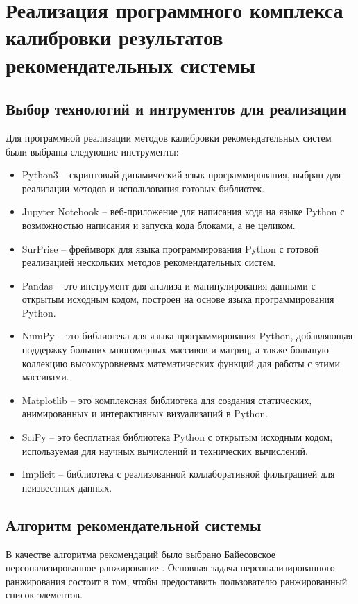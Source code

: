 \section{Реализация программного комплекса калибровки результатов рекомендательных системы}
\subsection{Выбор технологий и интрументов для реализации}
Для программной реализации методов калибровки рекомендательных систем были выбраны следующие инструменты:
\begin{itemize} 
    \item Python3 -- скриптовый динамический язык программирования, 
    выбран для реализации методов и использования готовых библиотек.
    \item Jupyter Notebook -- веб-приложение для написания кода на языке Python 
    с возможностью написания и запуска кода блоками, а не целиком.
    \item SurPrise \cite{sur} -- фреймворк для языка программирования Python
    с готовой реализацией нескольких методов рекомендательных систем.
    \item Pandas \cite{pandas} -- это инструмент для анализа и манипулирования данными с открытым исходным кодом,
    построен на основе языка программирования Python.
    \item NumPy \cite{numpy} -- это библиотека для языка программирования Python, добавляющая поддержку больших многомерных массивов и матриц, а также большую коллекцию высокоуровневых математических функций для работы с этими массивами.
    \item Matplotlib \cite{plot} -- это комплексная библиотека для создания статических, анимированных и интерактивных визуализаций в Python.
    \item SciPy \cite{Scipy} -- это бесплатная библиотека Python с открытым исходным кодом, используемая для научных вычислений и технических вычислений.
    \item Implicit \cite{imp} -- библиотека с реализованной коллаборативной фильтрацией для неизвестных данных.
  \end{itemize}

\pagebreak

\subsection{Алгоритм рекомендательной системы}

В качестве алгоритма рекомендаций было выбрано Байесовское 
персонализированное ранжирование \cite{bib8}. 
Основная задача персонализированного ранжирования состоит 
в том, чтобы предоставить пользователю ранжированный список 
элементов.

